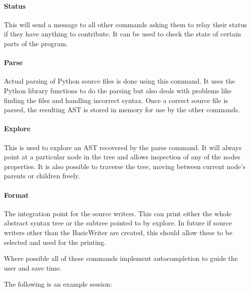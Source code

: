 \documentclass{report}
\begin{document}
\paragraph{Status}

This will send a message to all other commands asking them to relay their status if they have anything to contribute. It can be
used to check the state of certain parts of the program.

\paragraph{Parse}

Actual parsing of Python source files is done using this command. It uses the Python library functions to do the parsing but also
deals with problems like finding the files and handling incorrect syntax. Once a correct source file is parsed, the resulting AST
is stored in memory for use by the other commands.

\paragraph{Explore}

This is used to explore an AST recovered by the parse command. It will always point at a particular node in the tree and allows
inspection of any of the nodes properties. It is also possible to traverse the tree, moving between current node's parents or
children freely.

\paragraph{Format}

The integration point for the source writers. This can print either the whole abstract syntax tree or the subtree pointed to by
explore. In future if source writers other than the BasicWriter are created, this should allow these to be selected and used for
the printing.

Where possible all of these commands implement autocompletion to guide the user and save time.

The following is an example session:
\end{document}
